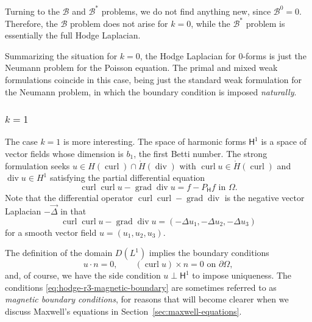 {Turning to the $\mathcal B$ and $\mathcal B^*$ problems, we do not find anything new, since $\mathcal B^0=0$. Therefore, the $\mathcal B$ problem does not arise for $k=0$, while the $\mathcal B^*$ problem is essentially the full Hodge Laplacian.}

{Summarizing the situation for $k=0$, the Hodge Laplacian for $0$-forms is just the Neumann problem for the Poisson equation. The primal and mixed weak formulations coincide in this case, being just the standard weak formulation for the Neumann problem, in which the boundary condition is imposed \emph{naturally}.}

\subsubsection{$k=1$}\label{subsec:hodge-r3-k1}

{The case $k=1$ is more interesting. The space of harmonic forms $\mathsf H^1$ is a space of vector fields whose dimension is $b_1$, the first Betti number. The strong formulation seeks $u\in H(\operatorname{curl})\cap\mathring H(\operatorname{div})$ with $\operatorname{curl}u\in\mathring H(\operatorname{curl})$ and $\operatorname{div}u\in H^1$ satisfying the partial differential equation}
\begin{equation}\label{eq:hodge-r3-vector-laplace}
\operatorname{curl}\operatorname{curl}u-\operatorname{grad}\operatorname{div}u=f-P_{\mathsf H}f\text{ in }\Omega.
\end{equation}
{Note that the differential operator $\operatorname{curl}\operatorname{curl}-\operatorname{grad}\operatorname{div}$ is the negative vector Laplacian $-\vec\Delta$ in that \[\operatorname{curl}\operatorname{curl}u-\operatorname{grad}\operatorname{div}u=(-\Delta u_1,-\Delta u_2,-\Delta u_3)\] for a smooth vector field $u=(u_1,u_2,u_3)$.}

{The definition of the domain $D(L^1)$ implies the boundary conditions}
\begin{equation}\label{eq:hodge-r3-magnetic-boundary}
u\cdot n=0,\qquad(\operatorname{curl}u)\times n=0\text{ on }\partial\Omega,
\end{equation}
{and, of course, we have the side condition $u\perp\mathsf H^1$ to impose uniqueness. The conditions \eqref{eq:hodge-r3-magnetic-boundary} are sometimes referred to as \emph{magnetic boundary conditions}, for reasons that will become clearer when we discuss Maxwell's equations in Section~\ref{sec:maxwell-equations}.}

